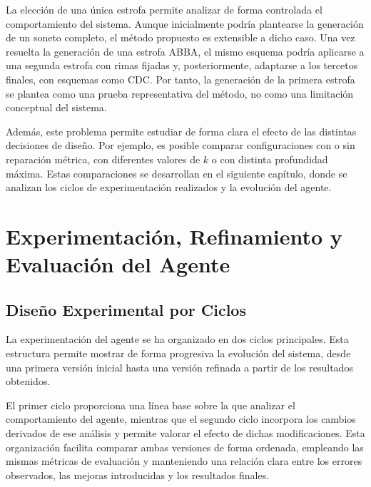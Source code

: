 \documentclass[12pt,a4paper,twoside,openright]{book}
\begin{document}

La elección de una única estrofa permite analizar de forma controlada el comportamiento del sistema. Aunque inicialmente podría plantearse la generación de un soneto completo, el método propuesto es extensible a dicho caso. Una vez resuelta la generación de una estrofa ABBA,
el mismo esquema podría aplicarse a una segunda estrofa con rimas fijadas y, posteriormente, adaptarse a los tercetos finales, con esquemas como CDC. Por tanto, la generación de la primera estrofa se plantea como una prueba representativa del método, no como una limitación
conceptual del sistema.

Además, este problema permite estudiar de forma clara el efecto de las distintas decisiones de diseño. Por ejemplo, es posible comparar configuraciones con o sin reparación métrica, con diferentes valores de $k$ o con distinta profundidad máxima.
Estas comparaciones se desarrollan en el siguiente capítulo, donde se analizan los ciclos de experimentación realizados y la evolución del agente.



\chapter{Experimentación, Refinamiento y Evaluación del Agente}

\section{Diseño Experimental por Ciclos}

La experimentación del agente se ha organizado en dos ciclos principales. Esta estructura permite mostrar de forma progresiva la evolución del sistema,
desde una primera versión inicial hasta una versión refinada a partir de los resultados obtenidos.

El primer ciclo proporciona una línea base sobre la que analizar el comportamiento del agente, mientras que el segundo ciclo incorpora los cambios derivados de ese análisis y permite valorar el efecto de dichas modificaciones.
Esta organización facilita comparar ambas versiones de forma ordenada, empleando las mismas métricas de evaluación y manteniendo una relación clara entre los errores observados, las mejoras introducidas y los resultados finales.
\end{document}
